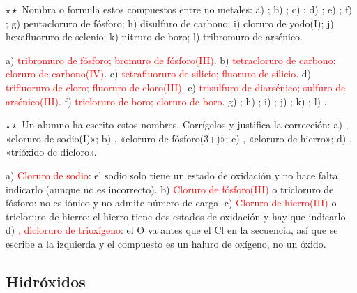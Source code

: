 \begin{exercise}
    \(\star\star\) Nombra o formula estos compuestos entre no metales: a) ; b) ; c) ; d) ;
    e) ; f) ; g) pentacloruro de fósforo; h) disulfuro de carbono; i) cloruro de yodo(I); j) hexafluoruro de
    selenio; k) nitruro de boro; l) tribromuro de arsénico.
    \begin{solu}
        a) \textcolor{red}{tribromuro de fósforo; bromuro de fósforo(III)}. b) \textcolor{red}{tetracloruro de carbono; cloruro de
        carbono(IV)}. c) \textcolor{red}{tetrafluoruro de silicio; fluoruro de silicio}. d) \textcolor{red}{trifluoruro de cloro;
        fluoruro de cloro(III)}. e) \textcolor{red}{trisulfuro de diarsénico; sulfuro de arsénico(III)}. f)
        \textcolor{red}{tricloruro de boro; cloruro de boro}. g) \textcolor{red}{}; h) \textcolor{red}{}; i)
        \textcolor{red}{}; j) \textcolor{red}{}; k) \textcolor{red}{}; l) \textcolor{red}{}.
    \end{solu}
\end{exercise}

\begin{exercise}
    \(\star\star\) Un alumno ha escrito estos nombres. Corrígelos y justifica la corrección: a) , «cloruro de sodio(I)»;
    b) , «cloruro de fósforo(3+)»; c) , «cloruro de hierro»; d) , «trióxido de dicloro».
    \begin{solu}
        a) \textcolor{red}{Cloruro de sodio}: el sodio solo tiene un estado de oxidación y no hace falta indicarlo (aunque no es
        incorrecto). b) \textcolor{red}{Cloruro de fósforo(III)} o tricloruro de fósforo: no es iónico y no admite número de carga.
        c) \textcolor{red}{Cloruro de hierro(III)} o tricloruro de hierro: el hierro tiene dos estados de oxidación y hay que
        indicarlo. d) \textcolor{red}{, dicloruro de trioxígeno}: el O va antes que el Cl en la secuencia, así que se
        escribe a la izquierda y el compuesto es un haluro de oxígeno, no un óxido.
    \end{solu}
\end{exercise}

\subsection{Hidróxidos}

